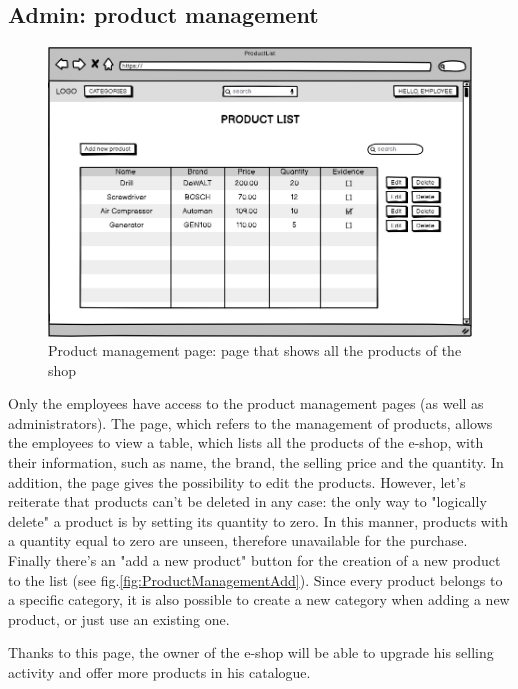 \subsection{Admin: product management} 
    \begin{figure}[H]
        \centering
        \includegraphics[width=\textwidth,height=0.7\textheight,keepaspectratio]{mockups/productListPageMockup.png}
            \caption{Product management page: page that shows all the products of the shop}
            \label{fig:ProductManagement}
    \end{figure}
Only the employees have access to the product management pages (as well as administrators). 
The page, which refers to the management of products, allows the employees to view a table, which lists all the products of the e-shop, with their information, such as name, the brand, the selling price and the quantity. 
In addition, the page gives the possibility to edit the products. However, let's reiterate that products can't be deleted in any case: the only way to "logically delete" a product is by setting its quantity to zero. In this manner, products with a quantity equal to zero are unseen, therefore unavailable for the purchase. 
Finally there's an "add a new product" button for the creation of a new product to the list (see fig.\ref{fig:ProductManagementAdd}). Since every product belongs to a specific category, it is also possible to create a new category when adding a new product, or just use an existing one.

Thanks to this page, the owner of the e-shop will be able to upgrade his selling activity and offer more products in his catalogue. 
    
